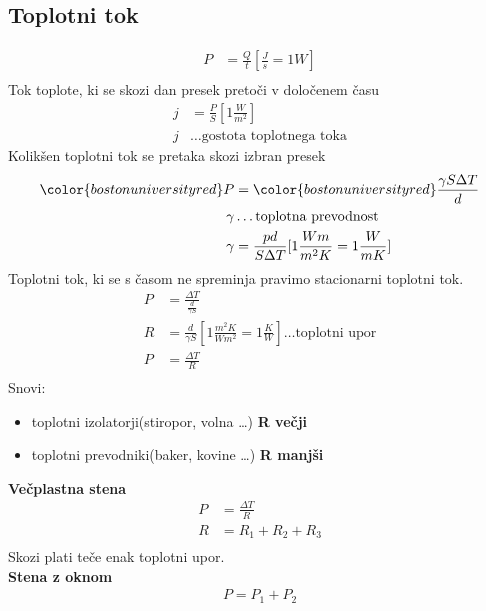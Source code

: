 {\color{indiagreen}\subsection{Toplotni tok}}
\begin{align*}
	P &= \frac{Q}{t}[\frac{J}{s}=1W]\\
\end{align*}
Tok toplote, ki se skozi dan presek pretoči v določenem času\\
\begin{align*}
	j &= \frac{P}{S}[1\frac{W}{m^2}]\\
	j &\dots \text{gostota toplotnega toka}
\end{align*}
Kolikšen toplotni tok se pretaka skozi izbran presek\\
\begin{align*}
	{\color{bostonuniversityred}P} &= {\color{bostonuniversityred}\frac{\gamma S \Delta T}{d}}\\
	\gamma &\dots \text{toplotna prevodnost}\\
	\gamma &= \frac{pd}{S \Delta T}[1 \frac{Wm}{m^2 K} = 1 \frac{W}{mK}]\\
\end{align*}
Toplotni tok, ki se s časom ne spreminja pravimo stacionarni toplotni tok.\\
\begin{align*}
	P &= \frac{\Delta T}{\frac{d}{\gamma S}}\\
	R &= \frac{d}{\gamma S}[1\frac{m^2K}{Wm^2} = 1\frac{K}{W}]\dots \text{toplotni upor}\\	
	P &= \frac{\Delta T}{R}\\
\end{align*}
Snovi:
\begin{itemize}
	\item toplotni izolatorji(stiropor, volna \dots) \textbf{R večji}
	\item toplotni prevodniki(baker, kovine \dots) \textbf{R manjši}
\end{itemize}
\textbf{Večplastna stena}\\
\begin{align*}
	P &= \frac{\Delta T}{R}\\
	R &= R_1 + R_2 + R_3\\
\end{align*}
Skozi plati teče enak toplotni upor.\\
\textbf{Stena z oknom}\\
\begin{align*}
	P = P_1 + P_2\\
\end{align*}


